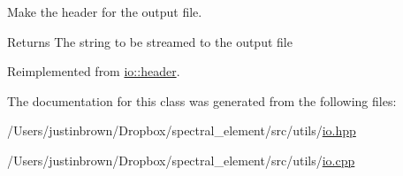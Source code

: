 Make the header for the output file. 



 \begin{DoxyReturn}{Returns}
The string to be streamed to the output file 
\end{DoxyReturn}


Reimplemented from \hyperlink{classio_1_1header_af7535d58a31712cdfb753ab0f19626f1}{io\-::header}.



The documentation for this class was generated from the following files\-:\begin{DoxyCompactItemize}
\item 
/\-Users/justinbrown/\-Dropbox/spectral\-\_\-element/src/utils/\hyperlink{io_8hpp}{io.\-hpp}\item 
/\-Users/justinbrown/\-Dropbox/spectral\-\_\-element/src/utils/\hyperlink{io_8cpp}{io.\-cpp}\end{DoxyCompactItemize}
